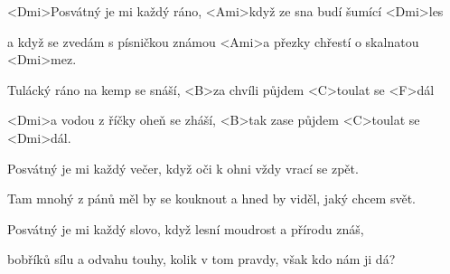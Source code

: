 

\zs
<Dmi>Posvátný je mi každý ráno,
<Ami>když ze sna budí šumící <Dmi>les

a když se zvedám s písničkou známou
<Ami>a přezky chřestí o skalnatou <Dmi>mez.
\ks

\zr
Tulácký ráno na kemp se snáší,
<B>za chvíli půjdem <C>toulat se <F>dál

<Dmi>a vodou z říčky oheň se zháší,
<B>tak zase půjdem <C>toulat se <Dmi>dál.
\kr

\zs
Posvátný je mi každý večer,
když oči k ohni vždy vrací se zpět.

Tam mnohý z pánů měl by se kouknout
a hned by viděl, jaký chcem svět.
\ks

\zr \kr

\zs
Posvátný je mi každý slovo,
když lesní moudrost a přírodu znáš,

bobříků sílu a odvahu touhy,
kolik v tom pravdy, však kdo nám ji dá?
\ks

\zr \kr

\kp






